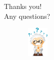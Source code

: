 \documentclass[10pt]{beamer}
\begin{document}
\begin{frame}[standout] 
    \huge \textlatin{Thanks you! }\\
    \large \textlatin{Any questions? }
    \begin{figure}
    	\includegraphics[width=1.5cm, height=1.5cm]{figures/questions.png}
    \end{figure}
\end{frame}
\end{document}
